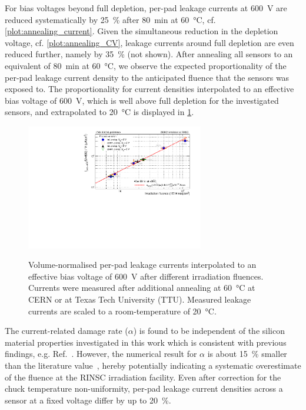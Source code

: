 For bias voltages beyond full depletion, per-pad leakage currents at \SI{600}{\volt} are reduced systematically by \SI{25}{\percent} after \SI{80}{\minute} at \SI{60}{\celsius}, cf. \ref{plot:annealing_current}.
Given the simultaneous reduction in the depletion voltage, cf. \ref{plot:annealing_CV}, leakage currents around full depletion are even reduced further, namely by \SI{35}{\percent} (not shown).
After annealing all sensors to an equivalent of \SI{80}{\minute} at \SI{60}{\celsius}, we observe the expected proportionality of the per-pad leakage current density to the anticipated fluence that the sensors was exposed to.
The proportionality for current densities interpolated to an effective bias voltage of \SI{600}{\volt}, which is well above full depletion for the investigated sensors, and extrapolated to \SI{20}{\celsius} is displayed in \ref{plot:alpha_600}.
\begin{figure}
	\captionsetup[subfigure]{aboveskip=-1pt,belowskip=-1pt}
	\centering
    \includegraphics[width=0.69\textwidth]{plots/alpha/alpha_600V.pdf}
    \label{plot:alpha_600}
	\caption{
	    Volume-normalised per-pad leakage currents interpolated to an effective bias voltage of \SI{600}{\volt} after different irradiation fluences.
        Currents were measured after additional annealing at \SI{60}{\celsius} at CERN or at Texas Tech University (TTU).
		Measured leakage currents are scaled to a room-temperature of \SI{20}{\celsius}.
	}
\end{figure}
The current-related damage rate ($\alpha$) is found to be independent of the silicon material properties investigated in this work which is consistent with previous findings, e.g. Ref.~\cite{MOLL199987}.
However, the numerical result for $\alpha$ is about \SI{15}{\percent} smaller than the literature value~\cite{moll:SiDamages}, hereby potentially indicating a systematic overestimate of the fluence at the RINSC irradiation facility. 
Even after correction for the chuck temperature non-uniformity, per-pad leakage current densities across a sensor at a fixed voltage differ by up to \SI{20}{\percent}.
